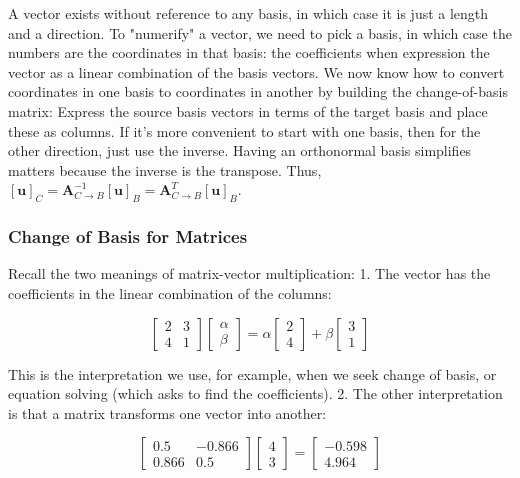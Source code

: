 \documentclass[main.tex]{subfiles}
\begin{document}
    A vector exists without reference to any basis, in which case it is just a length and a direction. To "numerify" a vector, we need to pick a basis, in which case the numbers are the coordinates in that basis: the coefficients when expression the vector as a linear combination of the basis vectors. We now know how to convert coordinates in one basis to coordinates in another by building the change-of-basis matrix: Express the source basis vectors in terms of the target basis and place these as columns. If it's more convenient to start with one basis, then for the other direction, just use the inverse. Having an orthonormal basis simplifies matters because the inverse is the transpose. Thus, $[\mathbf{u}]_{C}=\mathbf{A}_{C \rightarrow B}^{-1}[\mathbf{u}]_{B}=\mathbf{A}_{C \rightarrow B}^{T}[\mathbf{u}]_{B}$.

    \subsubsection{Change of Basis for Matrices}
    
    Recall the two meanings of matrix-vector multiplication: 1. The vector has the coefficients in the linear combination of the columns:

    $$
    \left[\begin{array}{ll}
    2 & 3 \\
    4 & 1
    \end{array}\right]\left[\begin{array}{l}
    \alpha \\
    \beta
    \end{array}\right]=\alpha\left[\begin{array}{l}
    2 \\
    4
    \end{array}\right]+\beta\left[\begin{array}{l}
    3 \\
    1
    \end{array}\right]
    $$
    
    This is the interpretation we use, for example, when we seek change of basis, or equation solving (which asks to find the coefficients). 2. The other interpretation is that a matrix transforms one vector into another:
    
    $$
    \left[\begin{array}{cc}
    0.5 & -0.866 \\
    0.866 & 0.5
    \end{array}\right]\left[\begin{array}{l}
    4 \\
    3
    \end{array}\right]=\left[\begin{array}{r}
    -0.598 \\
    4.964
    \end{array}\right]
    $$
    
\end{document}
